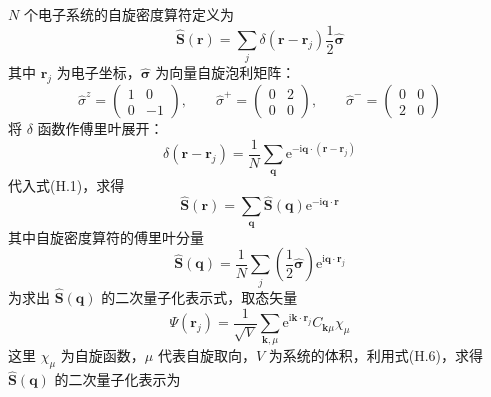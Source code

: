 $N$ 个电子系统的自旋密度算符定义为
\begin{equation}
  \hat{\boldsymbol{S}}(\boldsymbol{r})=\sum_{j}
  \delta(\boldsymbol{r}-\boldsymbol{r}_{j})
  \frac{1}{2}\hat{\boldsymbol{\sigma}}
\end{equation}
其中 $\boldsymbol{r}_{j}$ 为电子坐标，$\hat{\boldsymbol{\sigma}}$ 为向量自旋泡利矩阵：
\begin{equation}
  \hat{\sigma}^{z}=\begin{pmatrix}1&0\\0&-1\end{pmatrix}
  ,\qquad
  \hat{\sigma}^{+}=\begin{pmatrix}0&2\\0&0\end{pmatrix}
  ,\qquad
  \hat{\sigma}^{-}=\begin{pmatrix}0&0\\2&0\end{pmatrix}
\end{equation}
将 $\delta$ 函数作傅里叶展开：
\begin{equation}
  \delta(\boldsymbol{r}-\boldsymbol{r}_{j})=\frac{1}{N}
  \sum_{\boldsymbol{q}}\mathrm{e}^{-\mathrm{i}\boldsymbol{q}\cdot
  (\boldsymbol{r}-\boldsymbol{r}_{j})}
\end{equation}
代入式(H.1)，求得
\begin{equation}
  \hat{\boldsymbol{S}}(\boldsymbol{r})=\sum_{\boldsymbol{q}}
  \hat{\boldsymbol{S}}(\boldsymbol{q})
  \mathrm{e}^{-\mathrm{i}\boldsymbol{q}\cdot\boldsymbol{r}}
\end{equation}
其中自旋密度算符的傅里叶分量
\begin{equation}
  \hat{\boldsymbol{S}}(\boldsymbol{q})=\frac{1}{N}\sum_{j}
  \left(\frac{1}{2}\hat{\boldsymbol{\sigma}}\right)
  \mathrm{e}^{\mathrm{i}\boldsymbol{q}\cdot\boldsymbol{r}_{j}}
\end{equation}
为求出 $\hat{\boldsymbol{S}}(\boldsymbol{q})$ 的二次量子化表示式，取态矢量
\begin{equation}
  \Psi(\boldsymbol{r}_{j})=\frac{1}{\sqrt{V}}
  \sum_{\boldsymbol{k},\mu}
  \mathrm{e}^{\mathrm{i}\boldsymbol{k}\cdot\boldsymbol{r}_{j}}
  C_{\boldsymbol{k}\mu}\chi_{\mu}
\end{equation}
这里 $\chi_{\mu}$ 为自旋函数，$\mu$ 代表自旋取向，$V$ 为系统的体积，利用式(H.6)，求得 $\hat{\boldsymbol{S}}(\boldsymbol{q})$ 的二次量子化表示为
